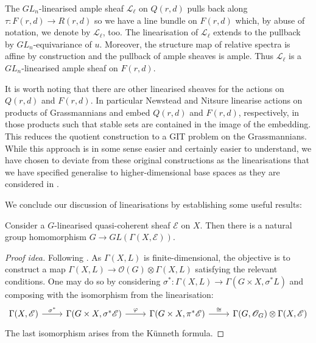 \documentclass[12pt]{ociamthesis}  %
\begin{document}
\begin{example}
  The $GL_n$-linearised ample sheaf $\mathscr L_\ell$ on
  $Q(r,d)$ pulls back along $\tau:F(r,d)\to R(r,d)$ so
  we have a line bundle on $F(r,d)$ which, by abuse of
  notation, we denote by $\mathscr L_\ell$, too. The
  linearisation of $\mathscr L_\ell$ extends to the pullback by
  $GL_n$-equivariance of $u$. Moreover, the structure
  map of relative spectra is affine by construction and the
  pullback of ample sheaves is ample. Thus $\mathscr L_\ell$
  is a $GL_n$-linearised ample sheaf on $F(r,d)$.
\end{example}

It is worth noting that there are other linearised sheaves for
the actions on $Q(r,d)$ and $F(r,d)$.  In particular
Newstead \cite{newstead1978} and Nitsure \cite{nitsure1991} linearise
actions on products of Grassmannians and embed $Q(r,d)$ and $F(r,d)$,
respectively, in those products such that stable sets are contained
in the image of the embedding. This reduces the quotient construction
to a GIT problem on the Grassmannians. While this approach is in
some sense easier and certainly easier to understand, we have
chosen to deviate from these original constructions as the linearisations
that we have specified generalise to higher-dimensional base spaces
as they are considered in \cite{huybrechts2010}.

We conclude our discussion of linearisations by establishing
some useful results:

\begin{lemma}\label{lem:linearisations_give_reps}
  Consider a $G$-linearised quasi-coherent sheaf $\mathscr E$ on $X$.
  Then there is a natural group homomorphism $G\to GL(\Gamma(X,\mathscr E))$.
  \begin{proof}[Proof idea]
    Following \cite[Lemma 5.19]{hoskins2016}. As $\Gamma(X,L)$
    is finite-dimensional, the objective is to construct a map
    $\Gamma(X,L) \to \mathscr O(G) \otimes \Gamma(X,L)$
    satisfying the relevant conditions. One may do so by considering
    $\sigma^* : \Gamma(X,L) \to \Gamma(G\times X,\sigma^*L)$ and
    composing with the isomorphism from the linearisation:
    \begin{equation*}
      \begin{tikzcd}
        {\Gamma(X,\mathscr E)} & {\Gamma(G\times X,\sigma^*\mathscr E)} & {\Gamma(G\times X,\pi^*\mathscr E)} & {\Gamma(G,\mathscr O_G)\otimes\Gamma(X,\mathscr E)}
        \arrow["{\sigma^*}", from=1-1, to=1-2]
        \arrow["\varphi", from=1-2, to=1-3]
        \arrow["\cong", from=1-3, to=1-4]
      \end{tikzcd}
    \end{equation*}
    The last isomorphism arises from the K\"unneth formula.
  \end{proof}
\end{lemma}
\end{document}
